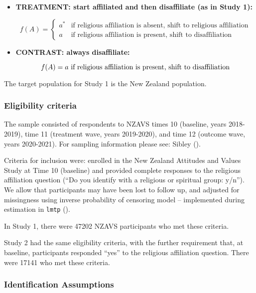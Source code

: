 \documentclass[
  singlecolumn]{article}
\begin{document}
\begin{itemize}
\item
  \textbf{TREATMENT: start affiliated and then disaffiliate (as in Study
  1):}

  \[
   f(A) = \begin{cases} a^* & \text{if religious affiliation is absent, shift to religious affiliation} \\ 
   a & \text{if religious affiliation is present, shift to disaffiliation} \end{cases}
   \]
\item
  \textbf{CONTRAST: always disaffiliate:}

  \[
   f(A) = a  ~ \text{if religious affiliation is present, shift to disaffiliation} \\ 
   \]
\end{itemize}

The target population for Study 1 is the New Zealand population.

\subsubsection{Eligibility criteria}\label{eligibility-criteria}

The sample consisted of respondents to NZAVS times 10 (baseline, years
2018-2019), time 11 (treatment wave, years 2019-2020), and time 12
(outcome wave, years 2020-2021). For sampling information please see:
Sibley ().

Criteria for inclusion were: enrolled in the New Zealand Attitudes and
Values Study at Time 10 (baseline) and provided complete responses to
the religious affiliation question (``Do you identify with a religious
or spiritual group: y/n''). We allow that participants may have been
lost to follow up, and adjusted for missingness using inverse
probability of censoring model -- implemented during estimation in
\texttt{lmtp} ().

In Study 1, there were 47202 NZAVS participants who met these criteria.

Study 2 had the same eligibility criteria, with the further requirement
that, at baseline, participants responded ``yes'' to the religious
affiliation question. There were 17141 who met these criteria.

\subsubsection{Identification
Assumptions}\label{identification-assumptions}
\end{document}
